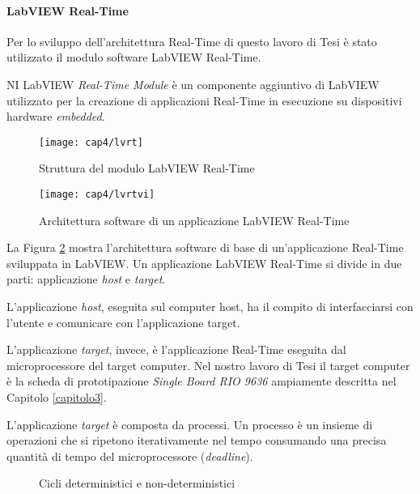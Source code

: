 \paragraph{LabVIEW Real-Time}
Per lo sviluppo dell'architettura Real-Time di questo lavoro di Tesi è stato utilizzato il modulo software LabVIEW Real-Time.

NI LabVIEW \textit{Real-Time Module} è un componente aggiuntivo di LabVIEW utilizzato per la creazione di applicazioni Real-Time in esecuzione su dispositivi hardware \textit{embedded}.

\begin{figure}[H]  
  \begin{center}
    \texttt{[image: cap4/lvrt]}
    \caption{Struttura del modulo LabVIEW Real-Time}
    \label{labviewrt}
  \end{center}
\end{figure}

\begin{figure}[H] 
  \begin{center}
    \texttt{[image: cap4/lvrtvi]}
    \caption{Architettura software di un applicazione LabVIEW Real-Time}
    \label{labviewrtvi}
  \end{center}
\end{figure}

La Figura \ref{labviewrtvi} mostra l'architettura software di base di un'applicazione Real-Time sviluppata in LabVIEW. Un applicazione LabVIEW Real-Time si divide in due parti: applicazione \textit{host} e \textit{target}.

L'applicazione \textit{host}, eseguita sul computer host, ha il compito di interfacciarsi con l'utente e comunicare con l'applicazione target. 

L'applicazione \textit{target}, invece, è l'applicazione Real-Time eseguita dal microprocessore del target computer. Nel nostro lavoro di Tesi il target computer è la scheda di prototipazione \textit{Single Board RIO 9636} ampiamente descritta nel Capitolo \ref{capitolo3}.

L'applicazione \textit{target} è composta da processi. Un processo è un insieme di operazioni che si ripetono iterativamente nel tempo consumando una precisa quantità di tempo del microprocessore (\textit{deadline}).
\begin{figure}[H]
\centering
{}
\hspace{5mm}
\caption{Cicli deterministici e non-deterministici}
\end{figure}

